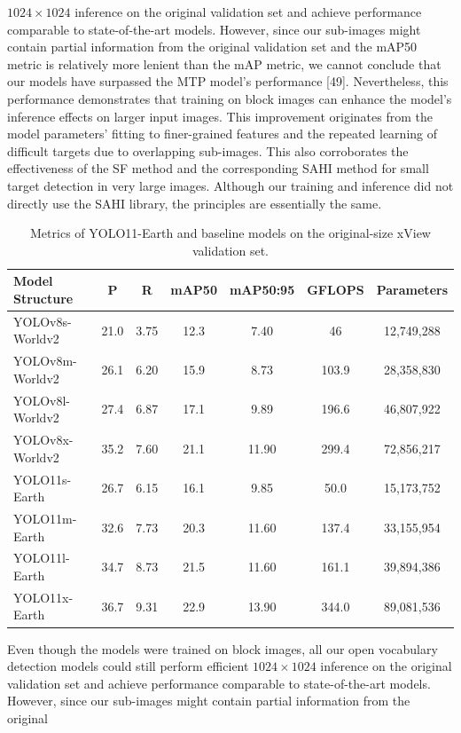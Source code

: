 \documentclass{article}
\begin{document}
$1024 \times 1024$ inference on the original validation set and achieve performance comparable to state-of-the-art 
models. However, since our sub-images might contain partial information from the original validation set and the 
mAP50 metric is relatively more lenient than the mAP metric, we cannot conclude that our models have surpassed the 
MTP model's performance [49]. Nevertheless, this performance demonstrates that training on block images can 
enhance the model's inference effects on larger input images. This improvement originates from the model 
parameters' fitting to finer-grained features and the repeated learning of difficult targets due to overlapping 
sub-images. This also corroborates the effectiveness of the SF method and the corresponding SAHI method for small 
target detection in very large images. Although our training and inference did not directly use the SAHI library, 
the principles are essentially the same.
\begin{table}[ht]
\centering
\caption{Metrics of YOLO11-Earth and baseline models on the original-size xView validation set.}
\begin{tabular}{lcccccc}
\toprule
\textbf{Model Structure} & \textbf{P} & \textbf{R} & \textbf{mAP50} & \textbf{mAP50:95} & \textbf{GFLOPS} & \textbf{Parameters} \\
\midrule
YOLOv8s-Worldv2 & 21.0 & 3.75 & 12.3 & 7.40 & 46 & 12,749,288 \\
YOLOv8m-Worldv2 & 26.1 & 6.20 & 15.9 & 8.73 & 103.9 & 28,358,830 \\
YOLOv8l-Worldv2 & 27.4 & 6.87 & 17.1 & 9.89 & 196.6 & 46,807,922 \\
YOLOv8x-Worldv2 & 35.2 & 7.60 & 21.1 & 11.90 & 299.4 & 72,856,217 \\
\midrule
YOLO11s-Earth & 26.7 & 6.15 & 16.1 & 9.85 & 50.0 & 15,173,752 \\
YOLO11m-Earth & 32.6 & 7.73 & 20.3 & 11.60 & 137.4 & 33,155,954 \\
YOLO11l-Earth & 34.7 & 8.73 & 21.5 & 11.60 & 161.1 & 39,894,386 \\
YOLO11x-Earth & 36.7 & 9.31 & 22.9 & 13.90 & 344.0 & 89,081,536 \\
\bottomrule
\end{tabular}
\end{table}
Even though the models were trained on block images, all our open vocabulary detection models could still perform 
efficient $1024 \times 1024$ inference on the original validation set and achieve performance comparable to 
state-of-the-art models. However, since our sub-images might contain partial information from the original 
\end{document}
